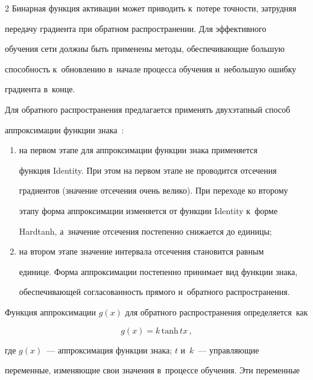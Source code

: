 \begin{multicols}{2}
  Бинарная функция активации может приводить к~потере точ\-ности, за\-труд\-няя 


передачу градиента при обрат\-ном распространении. Для эффективного 


обуче\-ния сети долж\-ны быть применены методы, обес\-пе\-чи\-ва\-ющие большую 


спо\-соб\-ность к~об\-нов\-ле\-нию в~начале процесса обуче\-ния и~небольшую ошиб\-ку 


градиента в~\mbox{конце}.


  


  Для обратного распространения предлагается применять двухэтапный способ 


аппроксимации функ\-ции знака~\cite{5-mal}: 


  \begin{enumerate}[(1)]


\item на первом этапе для аппроксимации функции знака применяется 


функ\-ция Identity. При этом на пер\-вом этапе не проводится отсечения 


градиентов (значение отсечения очень велико). При переходе ко второму 


этапу форма ап\-прок\-си\-ма\-ции изменяется от функ\-ции Identity к~форме 


Hardtanh, а~значение отсечения по\-сте\-пен\-но снижается до еди\-ницы; 


\item на втором этапе значение интервала отсечения становится рав\-ным 


единице. Форма аппроксимации по\-сте\-пен\-но принимает вид функ\-ции знака, 


обес\-пе\-чи\-ва\-ющей со\-гла\-со\-ван\-ность прямого и~об\-рат\-но\-го рас\-про\-стра\-не\-ния. 


  \end{enumerate}


  


  Функция аппроксимации $g(x)$ для обратного распространения опре\-де\-ля\-ет\-ся~как


  $$


  g(x)=k\,\mathrm{tanh}\,tx\,,


  $$


где $g(x)$~--- аппроксимация функции знака; $t$ и~$k$~--- управ\-ля\-ющие 


переменные, из\-ме\-ня\-ющие свои значения в~процессе обуче\-ния. Эти переменные 



\end{multicols}

